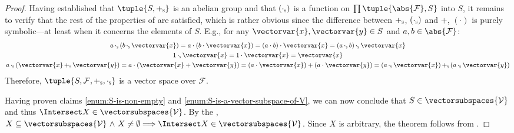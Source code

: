 \begin{proof}
    \vspace{0.3cm}
    \noindent
    Having established that \( \tuple{S, \smallsubscript{+}{S}} \) is an abelian group and that
    \( (\smallsubscript{\cdot}{S}) \) is a function on \( \prod \tuple{\abs{\mathcal{F}},S} \) into \( S \),
    it remains to verify that the rest of the properties of  are satisfied,
    which is rather obvious since the difference between \( \smallsubscript{+}{S} \), \( \mleft( \smallsubscript{\cdot}{S} \mright) \)
    and \( + \), \( (\cdot) \) is purely symbolic---at least when it concerns the elements of \( S \).
    E.g., for any \( \vectorvar{x}, \vectorvar{y} \in S \) and \( a, b \in \abs{\mathcal{F}} \):
    \begin{gather*}
        a \, \smallsubscript{\cdot}{S} \, \mleft( b \, \smallsubscript{\cdot}{S} \, \vectorvar{x} \mright)
            = a \cdot \mleft( b \cdot \vectorvar{x} \mright)
            = \mleft( a \cdot b \mright) \cdot \vectorvar{x}
            = \mleft( a \, \smallsubscript{\cdot}{S} \, b \mright) \, \smallsubscript{\cdot}{S} \, \vectorvar{x}\\
        1 \, \smallsubscript{\cdot}{S} \, \vectorvar{x} = 1 \cdot \vectorvar{x} = \vectorvar{x}\\
        a \, \smallsubscript{\cdot}{S} \, \mleft( \vectorvar{x} \, \smallsubscript{+}{S} \, \vectorvar{y} \mright)
            = a \cdot \mleft( \vectorvar{x} + \vectorvar{y} \mright)
            = \mleft( a \cdot \vectorvar{x} \mright) + \mleft( a \cdot \vectorvar{y} \mright)
            = \mleft( a \, \smallsubscript{\cdot}{S} \, \vectorvar{x} \mright) \, \smallsubscript{+}{S} \, \mleft( a \, \smallsubscript{\cdot}{S} \, \vectorvar{y} \mright)
    \end{gather*}
    Therefore, \( \tuple{S, \mathcal{F}, \smallsubscript{+}{S}, \smallsubscript{\cdot}{S}} \) is a vector space over \( \mathcal{F} \).

    \vspace{0.3cm}
    \noindent
    Having proven claims \ref{enum:S-is-non-empty} and \ref{enum:S-is-a-vector-subspace-of-V},
    we can now conclude that \( S \in \vectorsubspaces{\mathcal{V}} \) and thus \( \Intersect X \in \vectorsubspaces{\mathcal{V}} \).
    By the ,
    \( X \subseteq \vectorsubspaces{\mathcal{V}} \,\,{\land}\,\, X \neq \emptyset {\implies} \Intersect X \in \vectorsubspaces{\mathcal{V}} \).
    Since \( X \) is arbitrary, the theorem follows from .
\end{proof}

